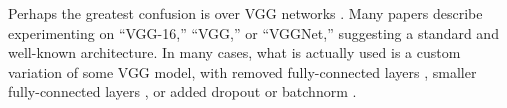 Perhaps the greatest confusion is over VGG networks \cite{vgg}. Many papers describe experimenting on ``VGG-16,'' ``VGG,'' or ``VGGNet,'' suggesting a standard and well-known architecture. In many cases, what is actually used is a custom variation of some VGG model, with removed fully-connected layers \cite{google-interchannel, thinet-channel-norms}, smaller fully-connected layers \cite{snip}, or added dropout or batchnorm \cite{network-slimming, snip, extreme-net-compress,sparse-variational-dropout, ding-auto-balanced, apple-pfa}.%





